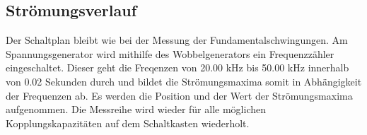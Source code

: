 \subsection{Strömungsverlauf}
Der Schaltplan bleibt wie bei der Messung der Fundamentalschwingungen. Am Spannungsgenerator wird mithilfe des Wobbelgenerators ein Frequenzzähler
eingeschaltet. Dieser geht die Freqenzen von 20.00 kHz bis 50.00 kHz innerhalb von 0.02 Sekunden durch und bildet die Strömungsmaxima somit in
Abhängigkeit der Frequenzen ab. Es werden die Position und der Wert der Strömungsmaxima aufgenommen. Die Messreihe wird wieder für alle
möglichen Kopplungskapazitäten auf dem Schaltkasten wiederholt.